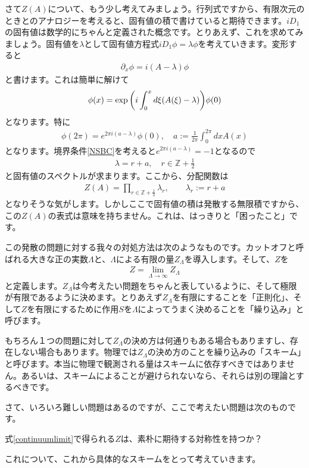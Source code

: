 \documentclass[paper=a4, fontsize=12pt, line_length=16cm, number_of_lines=33,dvipdfmx]{jlreq}
\numberwithin{equation}{section}
\newcommand{\del}{\partial}
\newcommand{\Zb}{\mathbb{Z}}
\newcommand{\halfint}{\Zb+\frac{1}{2}}
\newenvironment{myquote}{\begin{tcolorbox}[
  colback = blue!5, after = \noindent] }{\end{tcolorbox}}
\begin{document}
さて$Z(A)$について、もう少し考えてみましょう。行列式ですから、有限次元のときとのアナロジーを考えると、固有値の積で書けていると期待できます。$iD_1$の固有値は数学的にちゃんと定義された概念です。とりあえず、これを求めてみましょう。固有値を$\lambda$として固有値方程式$iD_1\phi=\lambda \phi$を考えていきます。変形すると
\begin{align}
  \del_x\phi=i(A-\lambda)\phi
\end{align}
と書けます。これは簡単に解けて
\begin{align}
  \phi(x)=\exp\qty(i\int_{0}^{x} d\xi(A(\xi)-\lambda))\phi(0)
\end{align}
となります。特に
\begin{align}
  \phi(2\pi)=e^{2\pi i (a-\lambda)}\phi(0),\quad a:=\frac{1}{2\pi}\int_{0}^{2\pi}dx A(x)
\end{align}
となります。境界条件\eqref{NSBC}を考えると$e^{2\pi i(a-\lambda)}=-1$となるので
\begin{align}
  \lambda=r+a,\quad r\in \halfint
\end{align}
と固有値のスペクトルが求まります。ここから、分配関数は
\begin{align}
  Z(A)=\prod_{r\in \halfint} \lambda_{r},\qquad \lambda_r:=r+a
\end{align}
となりそうな気がします。しかしここで固有値の積は発散する無限積ですから、この$Z(A)$の表式は意味を持ちません。これは、はっきりと「困ったこと」です。

この発散の問題に対する我々の対処方法は次のようなものです。カットオフと呼ばれる大きな正の実数$\Lambda$と、$\Lambda$による有限の量$Z_{\Lambda}$を導入します。そして、$Z$を
\begin{align}
  Z=\lim_{\Lambda\to \infty}Z_{\Lambda}\label{continuumlimit}
\end{align}
と定義します。$Z_{\Lambda}$は今考えたい問題をちゃんと表しているように、そして極限が有限であるように決めます。とりあえず$Z_{\Lambda}$を有限にすることを「正則化」、そして$Z$を有限にするために作用$S$を$\Lambda$によってうまく決めることを「繰り込み」と呼びます。

もちろん１つの問題に対して$Z_{\Lambda}$の決め方は何通りもある場合もありますし、存在しない場合もあります。物理では$Z_{\Lambda}$の決め方のことを繰り込みの「スキーム」と呼びます。本当に物理で観測される量はスキームに依存すべきではありません。あるいは、スキームによることが避けられないなら、それらは別の理論とするべきです。

さて、いろいろ難しい問題はあるのですが、ここで考えたい問題は次のものです。
\begin{myquote}
  式\eqref{continuumlimit}で得られる$Z$は、素朴に期待する対称性を持つか？
\end{myquote}
これについて、これから具体的なスキームをとって考えていきます。
\end{document}
